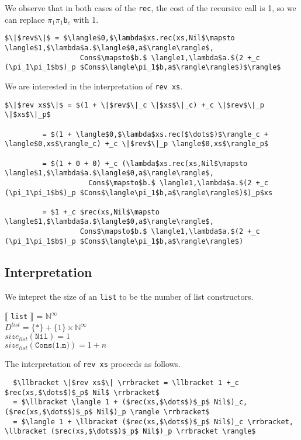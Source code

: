 \documentclass[12pt,letterpaper]{article}
\begin{document}
We observe that in both cases of the \texttt{rec}, the cost of the recursive call is 1, so we can replace \texttt{$\pi_1\pi_1$b$_c$} with 1.
\begin{lstlisting}
$\|$rev$\|$ = $\langle$0,$\lambda$xs.rec(xs,Nil$\mapsto \langle$1,$\lambda$a.$\langle$0,a$\rangle\rangle$,
                  Cons$\mapsto$b.$ \langle1,\lambda$a.$(2 +_c (\pi_1\pi_1$b$)_p $Cons$\langle\pi_1$b,a$\rangle\rangle$)$\rangle$
\end{lstlisting}

We are interested in the interpretation of \texttt{rev xs}.
\begin{lstlisting}
$\|$rev xs$\|$ = $(1 + \|$rev$\|_c \|$xs$\|_c) +_c \|$rev$\|_p \|$xs$\|_p$

         = $(1 + \langle$0,$\lambda$xs.rec($\dots$)$\rangle_c + \langle$0,xs$\rangle_c) +_c \|$rev$\|_p \langle$0,xs$\rangle_p$

         = $(1 + 0 + 0) +_c (\lambda$xs.rec(xs,Nil$\mapsto \langle$1,$\lambda$a.$\langle$0,a$\rangle\rangle$,
                    Cons$\mapsto$b.$ \langle1,\lambda$a.$(2 +_c (\pi_1\pi_1$b$)_p $Cons$\langle\pi_1$b,a$\rangle\rangle$)$)_p$xs

         = $1 +_c $rec(xs,Nil$\mapsto \langle$1,$\lambda$a.$\langle$0,a$\rangle\rangle$,
                  Cons$\mapsto$b.$ \langle1,\lambda$a.$(2 +_c (\pi_1\pi_1$b$)_p $Cons$\langle\pi_1$b,a$\rangle\rangle$)
\end{lstlisting}

\subsection*{Interpretation}

We intepret the size of an \texttt{list} to be the number of list constructors.
\begin{framed}
$\llbracket$ \texttt{list} $\rrbracket$ = $\mathbb{N}^\infty$\\
$D^{list} = \{\ast\} + \{1\} \times \mathbb{N}^\infty$\\
$size_{list}(\texttt{Nil}) = 1$\\
$size_{list}(\texttt{Cons(1,n)}) = 1 + n$\\
\end{framed}

The interpretation of \texttt{rev xs} proceeds as follows.
\begin{lstlisting}
  $\llbracket \|$rev xs$\| \rrbracket = \llbracket 1 +_c $rec(xs,$\dots$)$_p$ Nil$ \rrbracket$
  = $\llbracket \langle 1 + ($rec(xs,$\dots$)$_p$ Nil$)_c, ($rec(xs,$\dots$)$_p$ Nil$)_p \rangle \rrbracket$
  = $\langle 1 + \llbracket ($rec(xs,$\dots$)$_p$ Nil$)_c \rrbracket, \llbracket ($rec(xs,$\dots$)$_p$ Nil$)_p \rrbracket \rangle$
\end{lstlisting}
\end{document}
